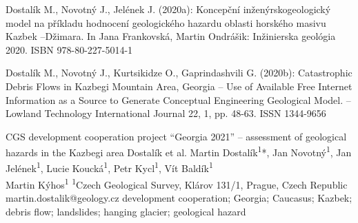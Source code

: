 {Dostalík M., Novotný J., Jelének J. (2020a): Koncepční inženýrskogeologický model na příkladu hodnocení geologického hazardu oblasti horského masivu Kazbek –Džimara. In Jana Frankovská, Martin Ondrášik: Inžinierska geológia 2020. ISBN 978-80-227-5014-1

Dostalík M., Novotný J., Kurtsikidze O., Gaprindashvili G. (2020b): Catastrophic Debris Flows in Kazbegi Mountain Area, Georgia – Use of Available Free Internet Information as a Source to Generate Conceptual Engineering Geological Model. – Lowland Technology International Journal 22, 1, pp. 48-63. ISSN 1344-9656
}


\abstract
{CGS development cooperation project \enquote{Georgia 2021} -- assessment of geological hazards in the Kazbegi area} 
{Dostalík et al.} 
{Martin Dostalík\textsuperscript{1}*, Jan Novotný\textsuperscript{1}, Jan Jelének\textsuperscript{1}, Lucie Koucká\textsuperscript{1}, Petr Kycl\textsuperscript{1}, Vít Baldík\textsuperscript{1}\\ Martin Kýhos\textsuperscript{1}} 
{\POtag} 
{
\textsuperscript{1}Czech Geological Survey, Klárov 131/1, Prague, Czech Republic
}
{martin.dostalik@geology.cz}  %
{development cooperation; Georgia; Caucasus; Kazbek; debris flow; landslides; hanging glacier; geological hazard}
